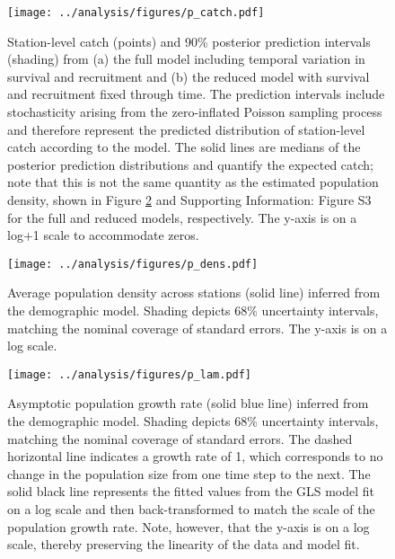 \documentclass[11pt]{article}
\begin{document}
\clearpage
\begin{figure}
\centering
\texttt{[image: ../analysis/figures/p\_catch.pdf]}
\caption{\label{fig:p_catch}
Station-level catch (points) and 90\% posterior prediction intervals (shading) 
from (a) the full model including temporal variation in survival and recruitment
and (b) the reduced model with survival and recruitment fixed through time.
The prediction intervals include stochasticity arising from the 
zero-inflated Poisson sampling process
and therefore represent the predicted distribution of 
station-level catch according to the model. 
The solid lines are medians of the posterior prediction distributions 
and quantify the expected catch; 
note that this is not the same quantity as the estimated population density, 
shown in Figure \ref{fig:p_dens} and Supporting Information: Figure S3
for the full and reduced models, respectively.
The y-axis is on a log+1 scale to accommodate zeros.
}
\end{figure}
\clearpage

\clearpage
\begin{figure}
\centering
\texttt{[image: ../analysis/figures/p\_dens.pdf]}
\caption{\label{fig:p_dens}
Average population density across stations (solid line) 
inferred from the demographic model.
Shading depicts 68\% uncertainty intervals, 
matching the nominal coverage of standard errors.
The y-axis is on a log scale.
}
\end{figure}
\clearpage

\clearpage
\begin{figure}
\centering
\texttt{[image: ../analysis/figures/p\_lam.pdf]}
\caption{\label{fig:p_lam}
Asymptotic population growth rate (solid blue line) inferred from the demographic model.
Shading depicts 68\% uncertainty intervals, 
matching the nominal coverage of standard errors.
The dashed horizontal line indicates a growth rate of 1,
which corresponds to no change in the population size from one time step to the next.
The solid black line represents the fitted values from the GLS model
fit on a log scale and then back-transformed 
to match the scale of the population growth rate.
Note, however, that the y-axis is on a log scale, 
thereby preserving the linearity of the data and model fit.
}
\end{figure}
\clearpage
\end{document}
